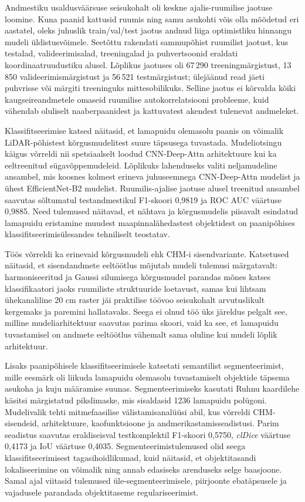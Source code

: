 Andmestiku usaldusväärsuse seisukohalt oli keskne ajalis-ruumilise jaotuse loomine. Kuna paanid kattusid ruumis ning samu asukohti võis olla mõõdetud eri aastatel, oleks juhuslik train/val/test jaotus andnud liiga optimistliku hinnangu mudeli üldistusvõimele. Seetõttu rakendati sammupõhist ruumilist jaotust, kus testalad, valideerimisalad, treeningalad ja puhvertsoonid eraldati koordinaatruudustiku alusel. Lõplikus jaotuses oli 67\,290 treeningmärgistust, 13\,850 valideerimismärgistust ja 56\,521 testmärgistust; ülejäänud read jäeti puhvrisse või märgiti treeninguks mittesobilikuks. Selline jaotus ei kõrvalda kõiki kaugseireandmetele omaseid ruumilise autokorrelatsiooni probleeme, kuid vähendab oluliselt naaberpaanidest ja kattuvatest akendest tulenevat andmeleket.

Klassifitseerimise katsed näitasid, et lamapuidu olemasolu paanis on võimalik LiDAR-põhistest kõrgusmudelitest suure täpsusega tuvastada. Mudeliotsingu käigus võrreldi nii spetsiaalselt loodud CNN-Deep-Attn arhitektuure kui ka eeltreenitud sügavõppemudeleid. Lõplikuks lahenduseks valiti neljamudeline ansambel, mis koosnes kolmest erineva juhuseemnega CNN-Deep-Attn mudelist ja ühest EfficientNet-B2 mudelist. Ruumilis-ajalise jaotuse alusel treenitud ansambel saavutas sõltumatul testandmestikul F1-skoori 0,9819 ja ROC AUC väärtuse 0,9885. Need tulemused näitavad, et nähtava ja kõrgusmudelis piisavalt esindatud lamapuidu eristamine muudest maapinnalähedastest objektidest on paanipõhises klassifitseerimisülesandes tehniliselt teostatav.

Töös võrreldi ka erinevaid kõrgusmudeli ehk CHM-i sisendvariante. Katsetused näitasid, et sisendandmete eeltöötlus mõjutab mudeli tulemusi märgatavalt: harmoniseeritud ja Gaussi silumisega kõrgusmudel parandas mõnes katses klassifikaatori jaoks ruumiliste struktuuride loetavust, samas kui lihtsam ühekanaliline 20 cm raster jäi praktilise töövoo seisukohalt arvutuslikult kergemaks ja paremini hallatavaks. Seega ei olnud töö üks järeldus pelgalt see, milline mudeliarhitektuur saavutas parima skoori, vaid ka see, et lamapuidu tuvastamisel on andmete eeltöötlus vähemalt sama oluline kui mudeli lõplik arhitektuur.

Lisaks paanipõhisele klassifitseerimisele katsetati semantilist segmenteerimist, mille eesmärk oli liikuda lamapuidu olemasolu tuvastamiselt objektide täpsema asukoha ja kuju määramise suunas. Segmenteerimiseks kasutati Ruhnu kaardilehe käsitsi märgistatud pikslimaske, mis sisaldasid 1236 lamapuidu polügoni. Mudelivalik tehti mitmefaasilise välistamisanalüüsi abil, kus võrreldi CHM-sisendeid, arhitektuure, kaofunktsioone ja andmerikastamisseadistusi. Parim seadistus saavutas eraldiseisval testkomplektil F1-skoori 0,5750, \textit{clDice} väärtuse 0,4173 ja IoU väärtuse 0,4035. Segmenteerimistulemused olid seega klassifitseerimisest tagasihoidlikumad, kuid näitasid, et objektitasandi lokaliseerimine on võimalik ning annab edasiseks arenduseks selge baasjoone. Samal ajal viitasid tulemused üle-segmenteerimisele, piirjoonte ebatäpsusele ja vajadusele parandada objektitaseme regulariseerimist.

